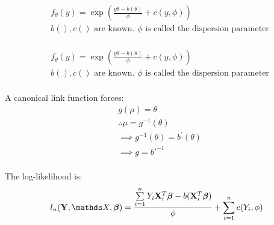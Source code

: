 \newcommand{\msigma}{\Sigma}
\newcommand{\mbeta}{\mathds{B}}

\newcommand{\argmax}{\mathop{\mathrm{argmax}}}
\newcommand{\argmin}{\mathop{\mathrm{argmin}}}

\newcommand{\deq}{:=}
\newcommand{\conv}[2]{{#1 * #2}} %
\newcommand{\abs}[1]{|{#1}|}
\newcommand{\ind}[1]{\mathds{1}(#1)} %
\newcommand{\PP}{\mathrm{P}} %
\newcommand{\EE}{\mathrm{E}} %



\begin {equation} \begin {split} 
& f_\theta(y) = \exp (\frac {y \theta - b(\theta)} {\phi} + c(y, \phi)) \\
& b(), c() \text { are known. $\phi$ is called the dispersion parameter} \\
\end {split} \end {equation}

\begin {equation} \begin {split} 
& f_\theta(y) = \exp (\frac {y \theta - b(\theta)} {\phi} + c(y, \phi)) \\
& b(), c() \text { are known. $\phi$ is called the dispersion parameter} \\
\end {split} \end {equation}

A canonical link function forces:
\begin {equation} \begin {split}
& g(\mu) = \theta \\
& \therefore \mu = g^{-1}(\theta) \\
& \implies g^{-1}(\theta) =  b^{'}(\theta) \\
& \implies g = b{'}^{-1} \\
\end {split} \end {equation}

The log-likelihood is:
\begin {equation} \begin {split} 
l_n(\vY, \mX, \vbeta) = \frac { \sum \limits_{i=1}^{n} Y_i \vX_i^T \vbeta -b(\vX_i^T \vbeta) } {\phi}  + \sum \limits_{i=1}^{n} c(Y_i, \phi) \\
\end {split} \end {equation}

